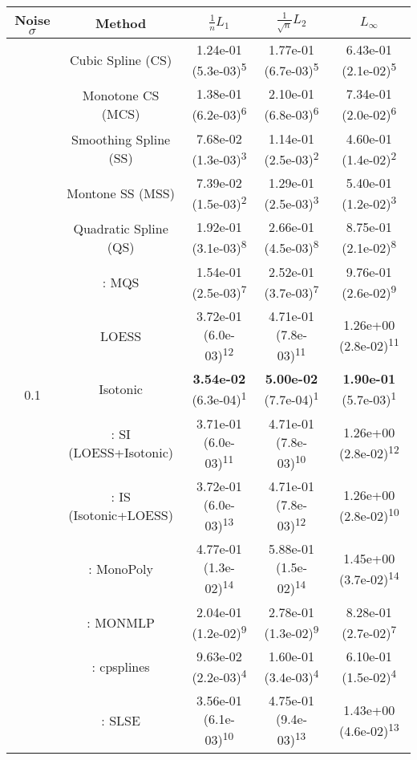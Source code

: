 \begin{tabular}{ccccc}
\toprule
Noise $\sigma$ & Method&$\frac 1n L_1$&$\frac{1}{\sqrt n}L_2$&$L_\infty$\tabularnewline
\midrule
\multirow{14}{*}{0.1}&Cubic Spline (CS)& 1.24e-01 (5.3e-03)\textsuperscript{5}& 1.77e-01 (6.7e-03)\textsuperscript{5}& 6.43e-01 (2.1e-02)\textsuperscript{5}\tabularnewline
&Monotone CS (MCS)& 1.38e-01 (6.2e-03)\textsuperscript{6}& 2.10e-01 (6.8e-03)\textsuperscript{6}& 7.34e-01 (2.0e-02)\textsuperscript{6}\tabularnewline
&Smoothing Spline (SS)& 7.68e-02 (1.3e-03)\textsuperscript{3}& 1.14e-01 (2.5e-03)\textsuperscript{2}& 4.60e-01 (1.4e-02)\textsuperscript{2}\tabularnewline
&Montone SS (MSS)& 7.39e-02 (1.5e-03)\textsuperscript{2}& 1.29e-01 (2.5e-03)\textsuperscript{3}& 5.40e-01 (1.2e-02)\textsuperscript{3}\tabularnewline
&Quadratic Spline (QS)& 1.92e-01 (3.1e-03)\textsuperscript{8}& 2.66e-01 (4.5e-03)\textsuperscript{8}& 8.75e-01 (2.1e-02)\textsuperscript{8}\tabularnewline
&\textcite{heMonotoneBsplineSmoothing1998}: MQS& 1.54e-01 (2.5e-03)\textsuperscript{7}& 2.52e-01 (3.7e-03)\textsuperscript{7}& 9.76e-01 (2.6e-02)\textsuperscript{9}\tabularnewline
&LOESS& 3.72e-01 (6.0e-03)\textsuperscript{12}& 4.71e-01 (7.8e-03)\textsuperscript{11}& 1.26e+00 (2.8e-02)\textsuperscript{11}\tabularnewline
&Isotonic& \textbf{3.54e-02} (6.3e-04)\textsuperscript{1}& \textbf{5.00e-02} (7.7e-04)\textsuperscript{1}& \textbf{1.90e-01} (5.7e-03)\textsuperscript{1}\tabularnewline
&\textcite{mammenEstimatingSmoothMonotone1991}: SI (LOESS+Isotonic)& 3.71e-01 (6.0e-03)\textsuperscript{11}& 4.71e-01 (7.8e-03)\textsuperscript{10}& 1.26e+00 (2.8e-02)\textsuperscript{12}\tabularnewline
&\textcite{mammenEstimatingSmoothMonotone1991}: IS (Isotonic+LOESS)& 3.72e-01 (6.0e-03)\textsuperscript{13}& 4.71e-01 (7.8e-03)\textsuperscript{12}& 1.26e+00 (2.8e-02)\textsuperscript{10}\tabularnewline
&\textcite{murrayFastFlexibleMethods2016a}: MonoPoly& 4.77e-01 (1.3e-02)\textsuperscript{14}& 5.88e-01 (1.5e-02)\textsuperscript{14}& 1.45e+00 (3.7e-02)\textsuperscript{14}\tabularnewline
&\textcite{cannonMonmlpMultilayerPerceptron2017}: MONMLP& 2.04e-01 (1.2e-02)\textsuperscript{9}& 2.78e-01 (1.3e-02)\textsuperscript{9}& 8.28e-01 (2.7e-02)\textsuperscript{7}\tabularnewline
&\textcite{navarro-garciaConstrainedSmoothingOutofrange2023}: cpsplines& 9.63e-02 (2.2e-03)\textsuperscript{4}& 1.60e-01 (3.4e-03)\textsuperscript{4}& 6.10e-01 (1.5e-02)\textsuperscript{4}\tabularnewline
&\textcite{groeneboomConfidenceIntervalsMonotone2023}: SLSE& 3.56e-01 (6.1e-03)\textsuperscript{10}& 4.75e-01 (9.4e-03)\textsuperscript{13}& 1.43e+00 (4.6e-02)\textsuperscript{13}\tabularnewline

\end{tabular}

